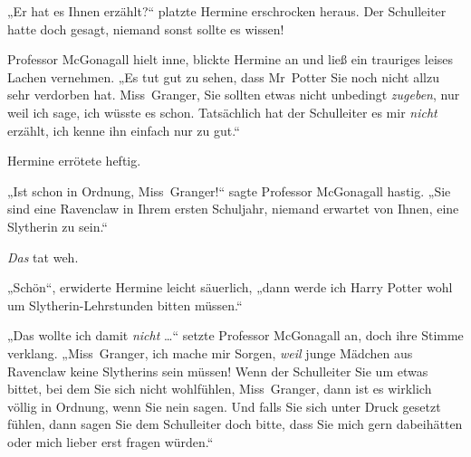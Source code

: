 „Er hat es Ihnen erzählt?“ platzte Hermine erschrocken heraus. Der Schulleiter hatte doch gesagt, niemand sonst sollte es wissen!

Professor McGonagall hielt inne, blickte Hermine an und ließ ein trauriges leises Lachen vernehmen.
„Es tut gut zu sehen, dass Mr~Potter Sie noch nicht allzu sehr verdorben hat. Miss~Granger, Sie sollten etwas nicht unbedingt \emph{zugeben}, nur weil ich sage, ich wüsste es schon. Tatsächlich hat der Schulleiter es mir \emph{nicht} erzählt, ich kenne ihn einfach nur zu gut.“

Hermine errötete heftig.

„Ist schon in Ordnung, Miss~Granger!“ sagte Professor McGonagall hastig.
„Sie sind eine Ravenclaw in Ihrem ersten Schuljahr, niemand erwartet von Ihnen, eine Slytherin zu sein.“

\emph{Das} tat weh.

„Schön“, erwiderte Hermine leicht säuerlich, „dann werde ich Harry Potter wohl um Slytherin-Lehrstunden bitten müssen.“

„Das wollte ich damit \emph{nicht} …“ setzte Professor McGonagall an, doch ihre Stimme verklang.
„Miss~Granger, ich mache mir Sorgen, \emph{weil} junge Mädchen aus Ravenclaw keine Slytherins sein müssen! Wenn der Schulleiter Sie um etwas bittet, bei dem Sie sich nicht wohlfühlen, Miss~Granger, dann ist es wirklich völlig in Ordnung, wenn Sie nein sagen. Und falls Sie sich unter Druck gesetzt fühlen, dann sagen Sie dem Schulleiter doch bitte, dass Sie mich gern dabeihätten oder mich lieber erst fragen würden.“

